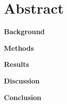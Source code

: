 \section*{Abstract}
\textbf{Background}

\blindtext

\textbf{Methods}

\blindtext

\textbf{Results}

\blindtext

\textbf{Discussion}


\textbf{Conclusion}
